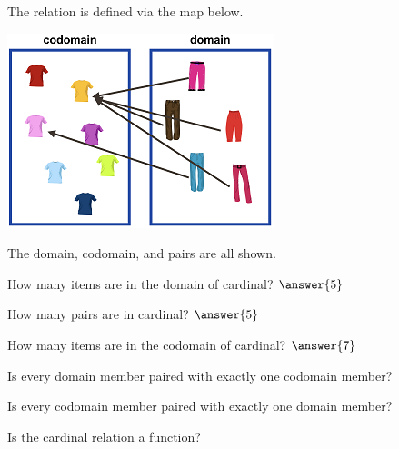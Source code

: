 \documentclass{ximera}
\begin{document}
  
  \begin{definition}
The relation  is defined via the map below.

  \includegraphics[width=293px,height=214px]{pics/r19.png}
  
  The domain, codomain, and pairs are all shown.


  
  \end{definition}
  


\begin{exercise}
How many items are in the domain of cardinal? $\answer{5}$
\end{exercise}


\begin{exercise}
How many pairs are in cardinal? $\answer{5}$
\end{exercise}

\begin{exercise}
How many items are in the codomain of cardinal? $\answer{7}$
\end{exercise}




\begin{exercise}
Is every domain member paired with exactly one codomain member?

  \begin{multipleChoice}
  \end{multipleChoice}
\end{exercise}


\begin{exercise}
Is every codomain member paired with exactly one domain member?

  \begin{multipleChoice}
  \end{multipleChoice}
\end{exercise}



\begin{exercise}
Is the cardinal relation a function?

  \begin{multipleChoice}
  \end{multipleChoice}
\end{exercise}
\end{document}
